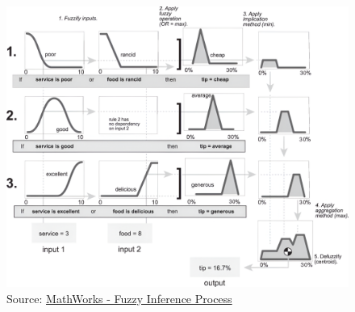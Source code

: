\documentclass[
	10pt,
	t		%
]{beamer}
\begin{document}
\begin{frame}
	\vspace{-0.8cm}
	\begin{figure}
		\centering
		\caption{\tiny{Source: \href{https://de.mathworks.com/help/fuzzy/fuzzy-inference-process.html}{MathWorks - Fuzzy Inference Process}}}
		\includegraphics[width=0.8\paperwidth]{figures/FullInferenceProcess.png}
	\end{figure}
	\label{fig:fuzzy_inference_full}

\end{frame}
\end{document}
